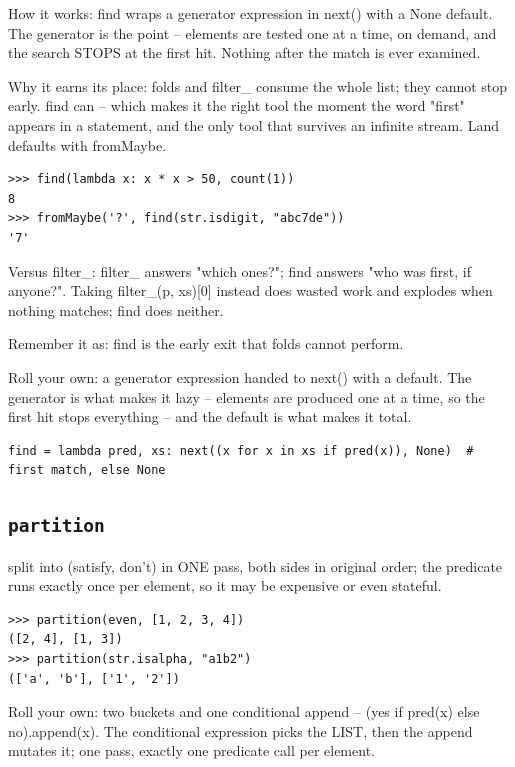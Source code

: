 \documentclass[10pt,letterpaper]{book}
\begin{document}
How it works: find wraps a generator expression in next() with a None default. The generator is the point -- elements are tested one at a time, on demand, and the search STOPS at the first hit. Nothing after the match is ever examined.


Why it earns its place: folds and filter\_ consume the whole list; they cannot stop early. find can -- which makes it the right tool the moment the word "first" appears in a statement, and the only tool that survives an infinite stream. Land defaults with fromMaybe.

\begin{lstlisting}[style=ex]
>>> find(lambda x: x * x > 50, count(1))
8
>>> fromMaybe('?', find(str.isdigit, "abc7de"))
'7'
\end{lstlisting}

Versus filter\_: filter\_ answers "which ones?"; find answers "who was first, if anyone?". Taking filter\_(p, xs)[0] instead does wasted work and explodes when nothing matches; find does neither.


Remember it as: find is the early exit that folds cannot perform.


Roll your own: a generator expression handed to next() with a default. The generator is what makes it lazy -- elements are produced one at a time, so the first hit stops everything -- and the default is what makes it total.

\begin{lstlisting}[style=ex]
find = lambda pred, xs: next((x for x in xs if pred(x)), None)  # first match, else None
\end{lstlisting}

\subsection{\texttt{partition}}\label{def:partition}
split into (satisfy, don't) in ONE pass, both sides in original order; the predicate runs exactly once per element, so it may be expensive or even stateful.
\begin{lstlisting}[style=ex]
>>> partition(even, [1, 2, 3, 4])
([2, 4], [1, 3])
>>> partition(str.isalpha, "a1b2")
(['a', 'b'], ['1', '2'])
\end{lstlisting}

Roll your own: two buckets and one conditional append -- (yes if pred(x) else no).append(x). The conditional expression picks the LIST, then the append mutates it; one pass, exactly one predicate call per element.
\end{document}
